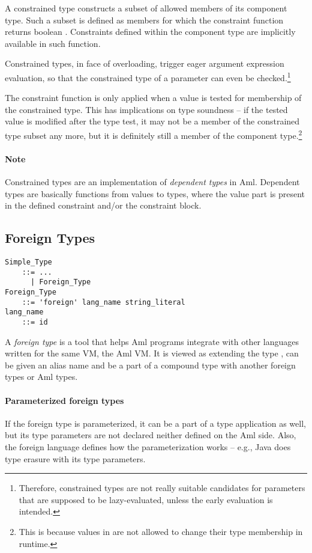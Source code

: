 A constrained type constructs a subset of allowed members of its component type. Such a subset is defined as members for which the constraint function returns boolean . Constraints defined within the component type are implicitly available in such function. 

Constrained types, in face of overloading, trigger eager argument expression evaluation, so that the constrained type of a parameter can even be checked.\footnote{Therefore, constrained types are not really suitable candidates for parameters that are supposed to be lazy-evaluated, unless the early evaluation is intended.}

The constraint function is only applied when a value is tested for membership of the constrained type. This has implications on type soundness -- if the tested value is modified after the type test, it may not be a member of the constrained type subset any more, but it is definitely still a member of the component type.\footnote{This is because values in \Aml are not allowed to change their type membership in runtime.}

\paragraph{Note}
Constrained types are an implementation of {\em dependent types} in Aml. Dependent types are basically functions from values to types, where the value part is present in the defined constraint and/or the constraint block. 





\subsection{Foreign Types}
\label{sec:foreign-types}

\grammar\begin{lstlisting}
Simple_Type 
    ::= ...
      | Foreign_Type
Foreign_Type 
    ::= 'foreign' lang_name string_literal
lang_name 
    ::= id
\end{lstlisting}

A {\em foreign type} is a tool that helps Aml programs integrate with other languages written for the same VM, the Aml VM. It is viewed as extending the type , can be given an alias name and be a part of a compound type with another foreign types or Aml types. 

\paragraph{Parameterized foreign types}
If the foreign type is parameterized, it can be a part of a type application as well, but its type parameters are not declared neither defined on the Aml side. Also, the foreign language defines how the parameterization works -- e.g., Java does type erasure with its type parameters.

